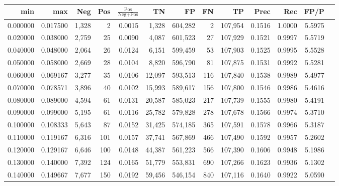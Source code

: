 \begin{tabular}{rrrrrrrrrrrrr}
\toprule
     min &      max &    Neg &   Pos & $\frac{\text{Pos}}{\text{Neg}+\text{Pos}}$ &      TN &      FP &      FN &      TP &   Prec &    Rec &   FP/P \\
\midrule
0.000000 & 0.017500 &  1,328 &     2 &                                     0.0015 &   1,328 & 604,282 &       2 & 107,954 & 0.1516 & 1.0000 & 5.5975 \\
0.020000 & 0.038000 &  2,759 &    25 &                                     0.0090 &   4,087 & 601,523 &      27 & 107,929 & 0.1521 & 0.9997 & 5.5719 \\
0.040000 & 0.048000 &  2,064 &    26 &                                     0.0124 &   6,151 & 599,459 &      53 & 107,903 & 0.1525 & 0.9995 & 5.5528 \\
0.050000 & 0.058000 &  2,669 &    28 &                                     0.0104 &   8,820 & 596,790 &      81 & 107,875 & 0.1531 & 0.9992 & 5.5281 \\
0.060000 & 0.069167 &  3,277 &    35 &                                     0.0106 &  12,097 & 593,513 &     116 & 107,840 & 0.1538 & 0.9989 & 5.4977 \\
0.070000 & 0.078571 &  3,896 &    40 &                                     0.0102 &  15,993 & 589,617 &     156 & 107,800 & 0.1546 & 0.9986 & 5.4616 \\
0.080000 & 0.089000 &  4,594 &    61 &                                     0.0131 &  20,587 & 585,023 &     217 & 107,739 & 0.1555 & 0.9980 & 5.4191 \\
0.090000 & 0.099000 &  5,195 &    61 &                                     0.0116 &  25,782 & 579,828 &     278 & 107,678 & 0.1566 & 0.9974 & 5.3710 \\
0.100000 & 0.108333 &  5,643 &    87 &                                     0.0152 &  31,425 & 574,185 &     365 & 107,591 & 0.1578 & 0.9966 & 5.3187 \\
0.110000 & 0.119167 &  6,316 &   101 &                                     0.0157 &  37,741 & 567,869 &     466 & 107,490 & 0.1592 & 0.9957 & 5.2602 \\
0.120000 & 0.129167 &  6,646 &   100 &                                     0.0148 &  44,387 & 561,223 &     566 & 107,390 & 0.1606 & 0.9948 & 5.1986 \\
0.130000 & 0.140000 &  7,392 &   124 &                                     0.0165 &  51,779 & 553,831 &     690 & 107,266 & 0.1623 & 0.9936 & 5.1302 \\
0.140000 & 0.149667 &  7,677 &   150 &                                     0.0192 &  59,456 & 546,154 &     840 & 107,116 & 0.1640 & 0.9922 & 5.0590 \\

\end{tabular}
